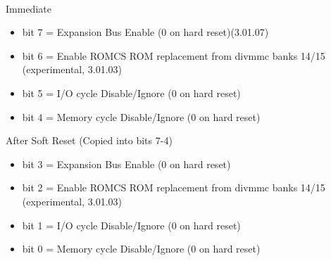 \\
Immediate
\begin{itemize}
\item bit 7 = Expansion Bus Enable (0 on hard reset)(3.01.07)
\item bit 6 = Enable ROMCS ROM replacement from divmmc banks 14/15
  (experimental, 3.01.03)
\item bit 5 = I/O cycle Disable/Ignore  (0 on
  hard reset)
\item bit 4 = Memory cycle Disable/Ignore  (0 on
  hard reset)
\end{itemize}
After Soft Reset (Copied into bits 7-4)
\begin{itemize}
\item bit 3 = Expansion Bus Enable (0 on hard reset)
\item bit 2 = Enable ROMCS ROM replacement from divmmc banks 14/15
  (experimental, 3.01.03)
\item bit 1 = I/O cycle Disable/Ignore  (0 on
  hard reset)
\item bit 0 = Memory cycle Disable/Ignore  (0 on
  hard reset)
\end{itemize}

